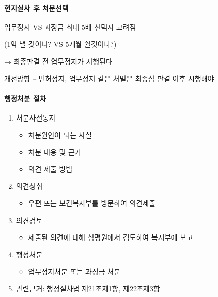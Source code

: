 \paragraph{현지실사 후 처분선택 }\par
업무정지  VS  과징금 최대 5배 선택시 고려점\par
(1억 낼 것이냐?  VS  5개월 쉴것이냐?)\par
→  최종판결 전 업무정지가 시행된다\par
개선방향 – 면허정지, 업무정지 같은 처벌은 최종심 판결 이후 시행해야

\paragraph{행정처분 절차}
\begin{enumerate}\tightlist
\item 처분사전통지
	\begin{itemize}\tightlist
	\item 처분원인이 되는 사실
	\item 처분 내용 및 근거
	\item 의견 제출 방법
	\end{itemize}
\item 의견청취
	\begin{itemize}\tightlist
	\item 우편 또는 보건복지부를 방문하여 의견제출
	\end{itemize}
\item 의견검토
	\begin{itemize}\tightlist
	\item 제출된 의견에 대해 심평원에서 검토하여 복지부에 보고
	\end{itemize}
\item 행정처분
	\begin{itemize}\tightlist
	\item 업무정지처분 또는 과징금 처분
	\end{itemize}	
\item 관련근거: 행정절차법 제21조제1항, 제22조제3항	
\end{enumerate}
	
